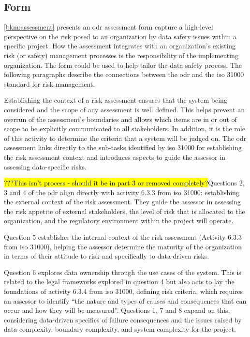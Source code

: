 \subsection{ Form}
\autoref{bkm:assessment} presents an \gls{odr} assessment form capture a high-level perspective on the risk posed to an organization by data safety issues within a specific project. How the assessment integrates with an organization's existing risk (or safety) management processes is the responsibility of the implementing organization. The form could be used to help tailor the data safety process. The following paragraphs describe the connections between the \gls{odr} and the
\gls{iso} 31000 \cite{citation:iso310002018risk}
standard for risk management.

Establishing the context of a risk assessment ensures that the system being considered and the scope of any assessment is well defined. This helps prevent an overrun of the assessment's boundaries and allows which items are in or out of scope to be explicitly communicated to all \glspl{stakeholder}. In addition, it is the role of this activity to determine the criteria that a system will be judged on. The \gls{odr} assessment links directly to the sub-tasks identified by \gls{iso} 31000 for establishing the risk assessment context and introduces aspects to guide the assessor in assessing  data-specific risks.

\hl{???This isn't process - should it be in part 3 or removed completely?}Questions 2, 3 and 4 of the \gls{odr} align directly with activity 6.3.3 from \gls{iso} 31000: establishing the external context of the risk assessment.
They guide the assessor in assessing the risk appetite of external \glspl{stakeholder}, the level of risk that is allocated to the organization, and the regulatory environment within the project will operate.

Question 5 establishes the internal context of the risk assessment (Activity 6.3.3 from \gls{iso} 31000),
helping the assessor determine the maturity of the organization in terms of their attitude to risk and specifically to data-driven risks.

Question 6 explores data ownership through the use cases of the system. This is related to the legal frameworks explored in question 4 but also acts to lay the foundations of activity 6.3.4 from \gls{iso} 31000,
defining risk criteria, which requires an assessor to identify ``the nature and types of causes and consequences that can occur and how they will be measured''. Questions 1, 7 and 8 expand on this, considering data-driven specifics of failure consequences and the issues raised by data complexity, boundary complexity, and system complexity for the project.

